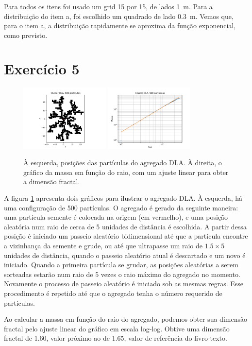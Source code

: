 \documentclass[a4paper, brazil]{article}
\begin{document}
Para todos os itens foi usado um grid 15 por 15, de lados \SI{1}{\meter}.
Para a distribuição do item a, foi escolhido um quadrado de lado \SI{0.3}{\meter}.
Vemos que, para o item a, a distribuição rapidamente se aproxima da função exponencial, como previsto.

\newpage
\section{Exercício 5}

\begin{figure}[ht]
\centering
\includegraphics[width=0.4\textwidth]{fig_5a.pdf}
\includegraphics[width=0.4\textwidth]{fig_5b.pdf}
\caption{À esquerda, posições das partículas do agregado DLA. À direita, o gráfico da massa em função do raio, com um ajuste linear para obter a dimensão fractal.}\label{fig5}
\end{figure}

A figura \ref{fig5} apresenta dois gráficos para ilustrar o agregado DLA.
À esquerda, há uma configuração de 500 partículas.
O agregado é gerado da seguinte maneira: uma partícula semente é colocada na origem (em vermelho), e uma posição aleatória num raio de cerca de 5 unidades de distância é escolhida.
A partir dessa posição é iniciado um passeio aleatório bidimensional até que a partícula encontre a vizinhança da semente e grude, ou até que ultrapasse um raio de \( \num{1.5} \times 5 \) unidades de distância, quando o passeio aleatório atual é descartado e um novo é iniciado.
Quando a primeira partícula se grudar, as posições aleatórias a serem sorteadas estarão num raio de 5 vezes o raio máximo do agregado no momento.
Novamente o processo de passeio aleatório é iniciado sob as mesmas regras.
Esse procedimento é repetido até que o agregado tenha o número requerido de partículas.

Ao calcular a massa em função do raio do agregado, podemos obter sua dimensão fractal pelo ajuste linear do gráfico em escala log-log.
Obtive uma dimensão fractal de \num{1.60}, valor próximo ao de \num{1.65}, valor de referência do livro-texto.
\end{document}
